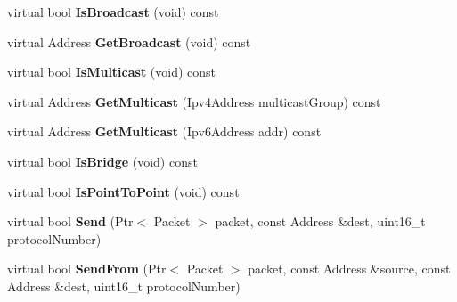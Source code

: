 \begin{DoxyCompactItemize}
\item 
\hypertarget{classns3_1_1PLC__NetDevice_a06c8ec6f9d9d0f6c503514078f0ac61a}{virtual bool {\bfseries \-Is\-Broadcast} (void) const }\label{classns3_1_1PLC__NetDevice_a06c8ec6f9d9d0f6c503514078f0ac61a}

\item 
\hypertarget{classns3_1_1PLC__NetDevice_aa3ae0ba784393f8924a96b43e6558559}{virtual \-Address {\bfseries \-Get\-Broadcast} (void) const }\label{classns3_1_1PLC__NetDevice_aa3ae0ba784393f8924a96b43e6558559}

\item 
\hypertarget{classns3_1_1PLC__NetDevice_a614cd80d1af3ca9d3e7634280e38ca60}{virtual bool {\bfseries \-Is\-Multicast} (void) const }\label{classns3_1_1PLC__NetDevice_a614cd80d1af3ca9d3e7634280e38ca60}

\item 
\hypertarget{classns3_1_1PLC__NetDevice_a3276897389472e732ab03102a61403ea}{virtual \-Address {\bfseries \-Get\-Multicast} (\-Ipv4\-Address multicast\-Group) const }\label{classns3_1_1PLC__NetDevice_a3276897389472e732ab03102a61403ea}

\item 
\hypertarget{classns3_1_1PLC__NetDevice_a1e6e26b5ee55820281a9b892276b8c16}{virtual \-Address {\bfseries \-Get\-Multicast} (\-Ipv6\-Address addr) const }\label{classns3_1_1PLC__NetDevice_a1e6e26b5ee55820281a9b892276b8c16}

\item 
\hypertarget{classns3_1_1PLC__NetDevice_ab1b87e5250404f28f5df008f82a32bdc}{virtual bool {\bfseries \-Is\-Bridge} (void) const }\label{classns3_1_1PLC__NetDevice_ab1b87e5250404f28f5df008f82a32bdc}

\item 
\hypertarget{classns3_1_1PLC__NetDevice_aa9d9f48b0a94478a9dfbe2039bf5a29a}{virtual bool {\bfseries \-Is\-Point\-To\-Point} (void) const }\label{classns3_1_1PLC__NetDevice_aa9d9f48b0a94478a9dfbe2039bf5a29a}

\item 
\hypertarget{classns3_1_1PLC__NetDevice_aa63bc1315a42908766ed69309832e0f0}{virtual bool {\bfseries \-Send} (\-Ptr$<$ \-Packet $>$ packet, const \-Address \&dest, uint16\-\_\-t protocol\-Number)}\label{classns3_1_1PLC__NetDevice_aa63bc1315a42908766ed69309832e0f0}

\item 
\hypertarget{classns3_1_1PLC__NetDevice_a9b7bba396dc7465cc1a80188a9466457}{virtual bool {\bfseries \-Send\-From} (\-Ptr$<$ \-Packet $>$ packet, const \-Address \&source, const \-Address \&dest, uint16\-\_\-t protocol\-Number)}\label{classns3_1_1PLC__NetDevice_a9b7bba396dc7465cc1a80188a9466457}


\end{DoxyCompactItemize}
